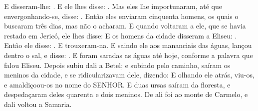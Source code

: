 {  E disseram-lhe: . E ele lhes disse: .
  Mas eles lhe importunaram, até que envergonhando-se, disse: . Então eles enviaram cinquenta homens, os quais o buscaram três dias, mas não o acharam.
  E quando voltaram a ele, que se havia restado em Jericó, ele lhes disse: 
  E os homens da cidade disseram a Eliseu: .
  Então ele disse: . E trouxeram-na.
  E saindo ele aos mananciais das águas, lançou dentro o sal, e disse: .
  E foram saradas as águas até hoje, conforme a palavra que falou Eliseu.
  Depois subiu dali a Betel; e subindo pelo caminho, saíram os meninos da cidade, e se ridicularizavam dele, dizendo: 
  E olhando ele atrás, viu-os, e amaldiçoou-os no nome do SENHOR. E duas ursas saíram da floresta, e despedaçaram deles quarenta e dois meninos.
  De ali foi ao monte de Carmelo, e dali voltou a Samaria.
\par }

